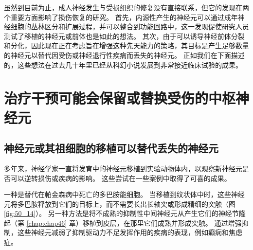 虽然到目前为止，成人神经发生与受损组织的修复没有直接联系，但它的发现在两个重要方面影响了损伤恢复的研究。 首先，内源性产生的神经元可以通过成年神经细胞的丛林区分和扩展过程，并可以整合到功能回路中，这一发现促使研究人员测试了移植的神经元或前体也是如此的想法。 其次，由于可以诱导神经前体分裂和分化，因此现在正在考虑旨在增强这种先天能力的策略，其目标是产生足够数量的神经元以替代因受伤或神经退行性疾病而丢失的神经元。 正如我们在下面描述的，这些想法在过去几十年里已经从科幻小说发展到非常接近临床试验的成果。

\section{治疗干预可能会保留或替换受伤的中枢神经元}


\subsection{神经元或其祖细胞的移植可以替代丢失的神经元}
多年来，神经学家一直将发育中的神经元移植到实验动物体内，以观察新神经元是否可以逆转损伤或疾病的影响。 这些尝试在一些案例中取得了可喜的成果。

一种是替代在帕金森病中死亡的多巴胺能细胞。 当移植到纹状体中时，这些神经元将多巴胺释放到它们的目标上，而不需要长出长轴突或形成精细的突触（图 \ref{fig:50_14}）。 
另一种方法是将不成熟的抑制性中间神经元从产生它们的神经节隆起（第 \ref{chap:chap46} 章）移植到皮层，在那里它们成熟并形成突触。 通过增强抑制，这些神经元减弱了抑制驱动力不足发挥作用的疾病的表现，例如癫痫和焦虑症。


